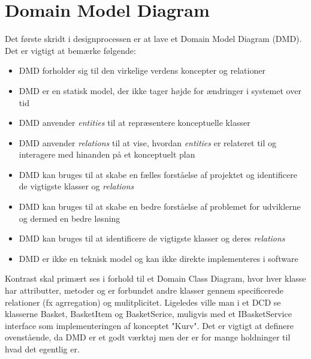 \section{Domain Model Diagram}
\label{sec:domain-model-diagram}
Det første skridt i designprocessen er at lave et Domain Model Diagram (DMD). Det er vigtigt at bemærke følgende:
\begin{itemize}
    \item DMD forholder sig til den virkelige verdens koncepter og relationer
    \item DMD er en statisk model, der ikke tager højde for ændringer i systemet over tid
    \item DMD anvender \emph{entities} til at repræsentere konceptuelle klasser
    \item DMD anvender \emph{relations} til at vise, hvordan \emph{entities} er relateret til og interagere med hinanden på et konceptuelt plan
    \item DMD kan bruges til at skabe en fælles forståelse af projektet og identificere de vigtigste klasser og \emph{relations}
    \item DMD kan bruges til at skabe en bedre forståelse af problemet for udviklerne og dermed en bedre løsning
    \item DMD kan bruges til at identificere de vigtigste klasser og deres \emph{relations}
    \item DMD er ikke en teknisk model og kan ikke direkte implementeres i software
\end{itemize} 
Kontrast skal primært ses i forhold til et Domain Class Diagram, hvor hver klasse har attributter, metoder og er forbundet andre klasser gennem specificerede relationer (fx agrregation) og mulitplicitet. 
Ligeledes ville man i et DCD se klasserne Basket, BasketItem og BasketSerice, muligvis med et IBasketService interface som implementeringen af konceptet "Kurv".
Det er vigtigt at definere ovenstående, da DMD er et godt værktøj men der er for mange holdninger til hvad det egentlig er.

